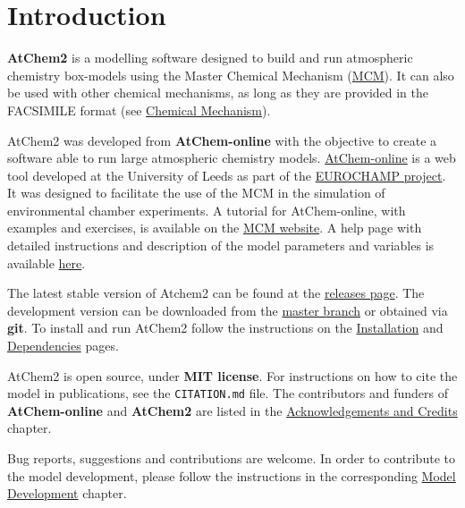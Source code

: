 \chapter{Introduction} \label{ch:introduction}

\textbf{AtChem2} is a modelling software designed to build and run
atmospheric chemistry box-models using the Master Chemical Mechanism
(\href{http://mcm.leeds.ac.uk/MCM/}{MCM}). It can also be used with
other chemical mechanisms, as long as they are provided in the
FACSIMILE format (see \hyperref[sec:mechanism]{Chemical Mechanism}).

AtChem2 was developed from \textbf{AtChem-online} with the objective
to create a software able to run large atmospheric chemistry
models. \href{https://atchem.leeds.ac.uk/webapp/}{AtChem-online} is a
web tool developed at the University of Leeds as part of the
\href{https://www.eurochamp.org/}{EUROCHAMP project}. It was designed
to facilitate the use of the MCM in the simulation of environmental
chamber experiments. A tutorial for AtChem-online, with examples and
exercises, is available on the
\href{http://mcm.leeds.ac.uk/MCMv3.3.1/atchem/tutorial_intro.htt}{MCM
  website}. A help page with detailed instructions and description of
the model parameters and variables is available
\href{https://atchem.leeds.ac.uk/webapp/run/help.html}{here}.

The latest stable version of Atchem2 can be found at the
\href{https://github.com/AtChem/AtChem2/releases}{releases page}. The
development version can be downloaded from the
\href{https://github.com/AtChem/AtChem2/archive/master.zip}{master
  branch} or obtained via \textbf{git}. To install and run AtChem2
follow the instructions on the \hyperref[sec:install]{Installation}
and \hyperref[sec:dependencies]{Dependencies} pages.

AtChem2 is open source, under \textbf{MIT license}. For instructions
on how to cite the model in publications, see the \texttt{CITATION.md}
file. The contributors and funders of \textbf{AtChem-online} and
\textbf{AtChem2} are listed in the
\hyperref[ch:credits]{Acknowledgements and Credits} chapter.

Bug reports, suggestions and contributions are welcome. In order to
contribute to the model development, please follow the instructions in
the corresponding \hyperref[ch:development]{Model Development}
chapter.
